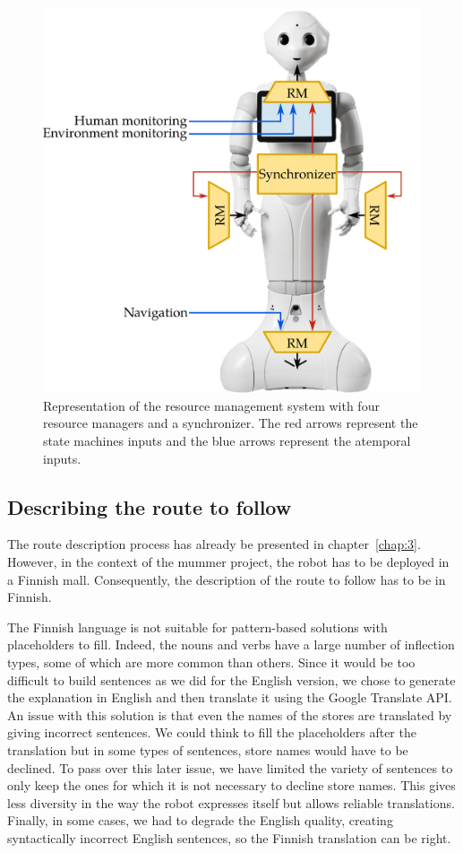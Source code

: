 \begin{figure}[!hb]
\centering
\includegraphics[scale=0.26]{figures/chapter8/rm.png}
\caption{\label{fig:chap8_rm} Representation of the resource management system with four resource managers and a synchronizer. The red arrows represent the state machines inputs and the blue arrows represent the atemporal inputs.}
\end{figure}

\subsection{Describing the route to follow}

The route description process has already be presented in chapter~\ref{chap:3}. However, in the context of the \acrshort{mummer} project, the robot has to be deployed in a Finnish mall. Consequently, the description of the route to follow has to be in Finnish.

The Finnish language is not suitable for pattern-based solutions with placeholders to fill. Indeed, the nouns and verbs have a large number of inflection types, some of which are more common than others. Since it would be too difficult to build sentences as we did for the English version, we chose to generate the explanation in English and then translate it using the Google Translate API. An issue with this solution is that even the names of the stores are translated by giving incorrect sentences. We could think to fill the placeholders after the translation but in some types of sentences, store names would have to be declined. To pass over this later issue, we have limited the variety of sentences to only keep the ones for which it is not necessary to decline store names. This gives less diversity in the way the robot expresses itself but allows reliable translations. Finally, in some cases, we had to degrade the English quality, creating syntactically incorrect English sentences, so the Finnish translation can be right.

